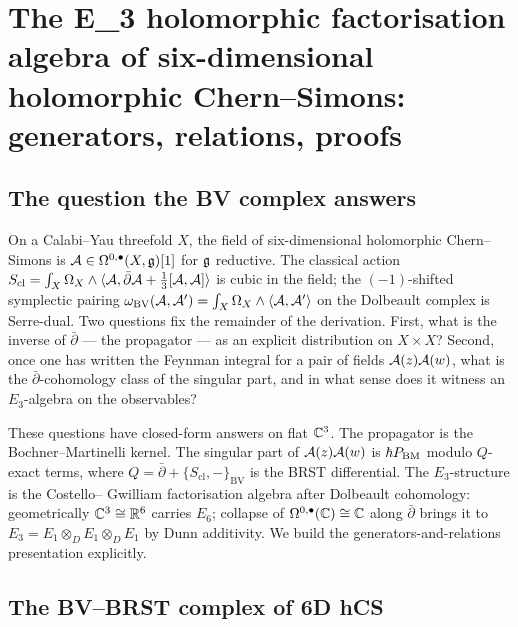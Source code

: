 \section{The E_3 holomorphic factorisation algebra of six-dimensional holomorphic Chern--Simons: generators, relations, proofs}
\label{opus12:sec:main}

\subsection*{The question the BV complex answers}

On a Calabi--Yau threefold $X$, the field of six-dimensional
holomorphic Chern--Simons is $\mathcal{A} \in \Omega^{0,\bullet}(X, \mathfrak{g})[1]$
for $\mathfrak{g}$ reductive. The classical action
$S_{\mathrm{cl}} = \int_X \Omega_X \wedge \langle \mathcal{A}, \bar\partial
\mathcal{A} + \tfrac{1}{3}[\mathcal{A}, \mathcal{A}]\rangle$ is cubic in the field; the
$(-1)$-shifted symplectic pairing
$\omega_{\mathrm{BV}}(\mathcal{A}, \mathcal{A}') = \int_X \Omega_X \wedge \langle
\mathcal{A}, \mathcal{A}'\rangle$ on the Dolbeault complex is Serre-dual. Two
questions fix the remainder of the derivation. First, what is the
inverse of $\bar\partial$ --- the propagator --- as an explicit
distribution on $X \times X$? Second, once one has written the
Feynman integral for a pair of fields $\mathcal{A}(z)\mathcal{A}(w)$, what is the
$\bar\partial$-cohomology class of the singular part, and in what
sense does it witness an $E_3$-algebra on the observables?

These questions have closed-form answers on flat $\mathbb{C}^3$. The
propagator is the Bochner--Martinelli kernel. The singular part of
$\mathcal{A}(z)\mathcal{A}(w)$ is $\hbar P_{\mathrm{BM}}$ modulo $Q$-exact
terms, where $Q = \bar\partial + \{S_{\mathrm{cl}}, -\}_{\mathrm{BV}}$
is the BRST differential. The $E_3$-structure is the Costello--
Gwilliam factorisation algebra after Dolbeault cohomology: geometrically
$\mathbb{C}^3 \cong \mathbb{R}^6$ carries $E_6$; collapse of
$\Omega^{0,\bullet}(\mathbb{C}) \cong \mathbb{C}$ along $\bar\partial$ brings it to
$E_3 = E_1 \otimes_D E_1 \otimes_D E_1$ by Dunn additivity. We build
the generators-and-relations presentation explicitly.

\subsection{The BV--BRST complex of 6D hCS}
\label{opus12:sec:bv-brst}

